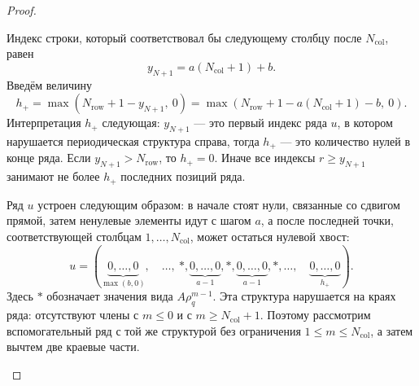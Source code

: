 \begin{proof}
\begin{enumerate}
    Индекс строки, который соответствовал бы следующему столбцу после
    $N_{\mathrm{col}}$, равен
    \begin{equation}
        y_{N+1}
        =
        a(N_{\mathrm{col}}+1)+b.
        \label{eq:y-next}
    \end{equation}
    Введём величину
    \begin{equation}
        h_+
        =
        \max\left(
            N_{\mathrm{row}}+1-y_{N+1},\ 0
        \right)
        =
        \max\left(
            N_{\mathrm{row}}+1-a(N_{\mathrm{col}}+1)-b,\ 0
        \right).
        \label{eq:h-plus}
    \end{equation}
    Интерпретация $h_+$ следующая: $y_{N+1}$ --- это первый индекс ряда $u$,
    в котором нарушается периодическая структура справа, тогда $h_+$ --- это
    количество нулей в конце ряда. Если $y_{N+1}>N_{\mathrm{row}}$, то
    $h_+=0$. Иначе все индексы
    $r\ge y_{N+1}$ занимают не более $h_+$ последних позиций ряда.

    Ряд $u$ устроен следующим образом: в начале стоят нули, связанные со
    сдвигом прямой, затем ненулевые элементы идут с шагом $a$, а после
    последней точки, соответствующей столбцам $1,\dots,N_{\mathrm{col}}$,
    может остаться нулевой хвост:
    \begin{equation*}
        u=
        (
        \underbrace{0,\dots,0}_{\max(b,0)},
        \quad
        \dots,\ *,
        \underbrace{0,\dots,0}_{a-1},
        *,
        \underbrace{0,\dots,0}_{a-1},
        *,\dots,
        \quad
        \underbrace{0,\dots,0}_{h_+}
        ).
    \end{equation*}
    Здесь $*$ обозначает значения вида $A\rho_q^{m-1}$. Эта структура
    нарушается на краях ряда: отсутствуют члены с $m\le0$ и с
    $m\ge N_{\mathrm{col}}+1$. Поэтому рассмотрим вспомогательный ряд с той
    же структурой без ограничения $1\le m\le N_{\mathrm{col}}$, а затем
    вычтем две краевые части.


\end{enumerate}
\end{proof}
